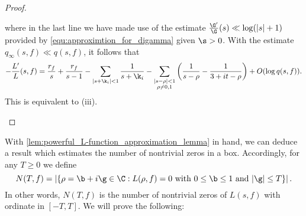 \begin{proof}
\begin{enumerate}[label=(\roman*)]
\[      \]
      where in the last line we have made use of the estimate $\frac{\G'}{\G}(s) \ll \log(|s|+1)$ provided by \cref{equ:approximtion_for_digamma} given $\s > 0$. With the estimate $q_{\infty}(s,f) \ll q(s,f)$, it follows that
      \[
        -\frac{L'}{L}(s,f) = \frac{r_{f}}{s}+\frac{r_{f}}{s-1}-\sum_{|s+\k_{i}| < 1}\frac{1}{s+\k_{i}}-\sum_{\substack{|s-\rho| < 1 \\ \rho \neq 0,1}}\left(\frac{1}{s-\rho}-\frac{1}{3+it-\rho}\right)+O(\log{q(s,f)}).
      \]
      This is equivalent to (iii).
      \end{enumerate}
    \end{proof}

    With \cref{lem:powerful_L-function_approximation_lemma} in hand, we can deduce a result which estimates the number of nontrivial zeros in a box. Accordingly, for any $T \ge 0$ we define
    \[
      N(T,f) = \left|\{\rho = \b+i\g \in \C:L(\rho,f) = 0 \text{ with } 0 \le \b \le 1 \text{ and } |\g| \le T\}\right|.
    \]
    In other words, $N(T,f)$ is the number of nontrivial zeros of $L(s,f)$ with ordinate in $[-T,T]$. We will prove the following:

